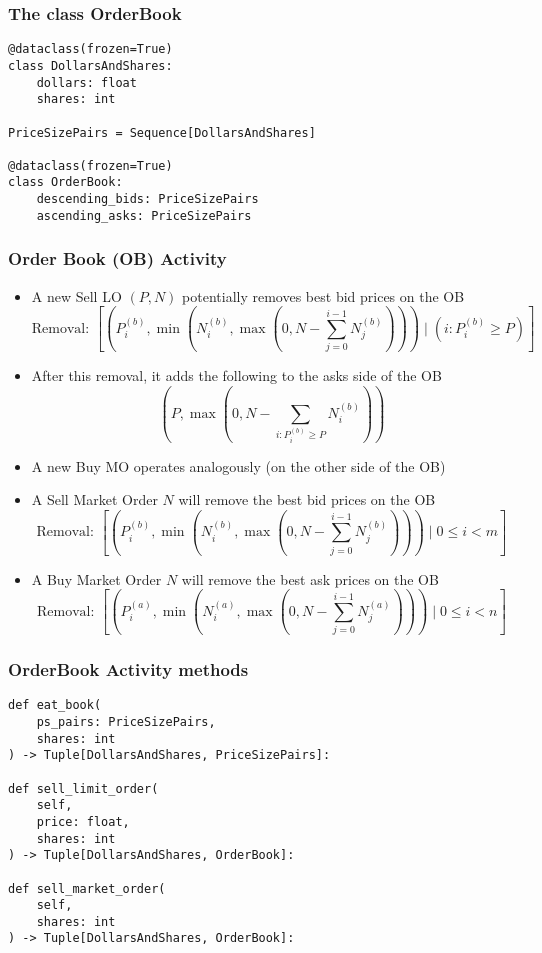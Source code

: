 \documentclass[handout]{beamer}
\begin{document}
\begin{frame}[fragile]
\frametitle{The class OrderBook}
\pause
\begin{lstlisting}
@dataclass(frozen=True)
class DollarsAndShares:
    dollars: float
    shares: int

PriceSizePairs = Sequence[DollarsAndShares]

@dataclass(frozen=True)
class OrderBook:
    descending_bids: PriceSizePairs
    ascending_asks: PriceSizePairs
\end{lstlisting}
\end{frame}

\begin{frame}
\frametitle{Order Book (OB) Activity}
\pause
\begin{itemize}[<+->]
\item A new Sell LO $(P,N)$ potentially removes best bid prices on the OB
$$\mbox{Removal: } [(P_i^{(b)}, \min(N_i^{(b)}, \max(0, N - \sum_{j=0}^{i-1} N_j^{(b)}))) \mid (i: P_i^{(b)} \geq P)]$$
\item After this removal, it adds the following to the asks side of the OB 
$$(P, \max(0, N - \sum_{i: P_i^{(b)} \geq P}  N_i^{(b)}))$$
\item A new Buy MO operates analogously (on the other side of the OB)
\item A Sell Market Order $N$ will remove the best bid prices on the OB
$$\mbox{Removal: } [(P_i^{(b)}, \min(N_i^{(b)}, \max(0, N - \sum_{j=0}^{i-1} N_j^{(b)}))) \mid 0 \leq i < m]$$
\item A Buy Market Order $N$ will remove the best ask prices on the OB
$$\mbox{Removal: } [(P_i^{(a)}, \min(N_i^{(a)}, \max(0, N - \sum_{j=0}^{i-1} N_j^{(a)}))) \mid 0 \leq i < n]$$
\end{itemize}
\end{frame}

\begin{frame}[fragile]
\frametitle{OrderBook Activity methods}
\pause
\begin{lstlisting}
def eat_book(
    ps_pairs: PriceSizePairs,
    shares: int
) -> Tuple[DollarsAndShares, PriceSizePairs]:

def sell_limit_order(
    self,
    price: float,
    shares: int
) -> Tuple[DollarsAndShares, OrderBook]:

def sell_market_order(
    self,
    shares: int
) -> Tuple[DollarsAndShares, OrderBook]:
\end{lstlisting}
\end{frame}
\end{document}
